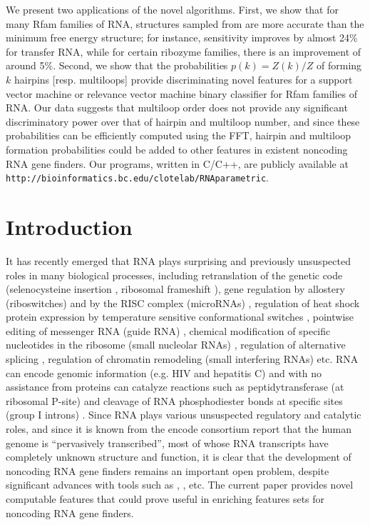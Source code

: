 We present two applications of the novel algorithms. First, we show that
for many Rfam families of RNA, structures sampled from {\rnahairpinml}
are more accurate than the minimum free energy structure; for instance,
sensitivity improves by almost 24\% for transfer RNA, while for
certain ribozyme families, there is an improvement of around 5\%.
Second, we show that the probabilities $p(k) = Z(k)/Z$
of forming $k$ hairpins [resp. multiloops] provide discriminating
novel features for a support vector machine or relevance vector machine
binary classifier for Rfam families of RNA.
Our data suggests that multiloop order does
not provide any significant discriminatory power over that of hairpin
and multiloop number, and since these probabilities
can be efficiently computed using the FFT, hairpin and multiloop formation
probabilities could be added to other features in existent
noncoding RNA gene finders.
Our programs, written in C/C++, are publicly available at
{\tt http://bioinformatics.bc.edu/clotelab/RNAparametric}.

\section{Introduction}

It has recently emerged that RNA plays surprising and previously unsuspected
roles in many biological processes, including retranslation of the genetic code
(selenocysteine insertion \cite{boeckForschhammer}, ribosomal frameshift
\cite{denise:frameshift}), gene regulation by allostery
(riboswitches) \cite{mandalBoeseBarrickWinklerBreaker}
and by the RISC complex (microRNAs) \cite{burgeBartel:miRNAscience},
regulation of heat shock protein expression by
temperature sensitive conformational switches \cite{ROSEswitch,tuckerBreaker:review},
pointwise editing of messenger RNA (guide RNA)
\cite{haeseler:Cryptogenes}, chemical
modification of specific nucleotides in the ribosome (small nucleolar RNAs)
\cite{loweEddy:snoRNAinArchaea},
regulation of alternative splicing \cite{Cheah.n07},
regulation of chromatin remodeling (small interfering RNAs)
\cite{Cam.c09} etc. RNA can encode
genomic information (e.g. HIV and hepatitis C) and with no assistance
from proteins can catalyze reactions such as peptidytransferase
(at ribosomal P-site) \cite{weinger:peptidyltransferase}
and cleavage
of RNA phosphodiester bonds at specific sites (group I introns)
\cite{intron:reviewCech}.
Since RNA plays various unsuspected regulatory and catalytic roles, and
since it is known from the {\sc encode} consortium report
\cite{encodeConsortium} that
the human genome is ``pervasively transcribed'',
most of whose RNA transcripts have completely unknown structure
and function, it is clear that the development of
noncoding RNA gene finders
remains an important open problem, despite significant
advances with tools such as {\rnaz} \cite{Gruber.nar07},
{\foldalign} \cite{Havgaard.nar05}, etc. The current paper
provides novel computable features that could prove useful
in enriching features sets for noncoding RNA gene finders.


